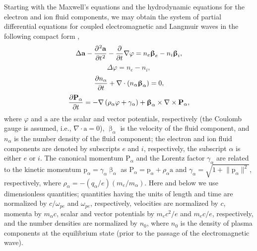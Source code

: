 \documentclass[10pt, a4paper, twoside, openright]{report}
\newcommand{\norm}[1]{\lVert#1\rVert}
\renewcommand{\vec}[1]{\boldsymbol{\mathrm{#1}}}
\newcommand{\rot}[1]{\nabla \times #1}
\newcommand{\grad}[1]{\nabla #1}
\renewcommand{\div}[1]{\nabla \cdot #1}
\newcommand{\laplace}[1]{\Delta #1}
\begin{document}
Starting with the Maxwell's equations and the hydrodynamic equations for the electron and ion fluid components, we may obtain the system of partial differential equations for coupled electromagnetic and Langmuir waves in the following compact form \cite{Farina2001, Bulanov2013, Bulanov2021},
\begin{equation}\label{eq:eq_for_vector_potential}
\laplace{\vec{a}} - \diffp[2]{\vec{a}}{t} - \diffp{}{t} \grad{\varphi} = n_e \vec{\upbeta}_e - n_i \vec{\upbeta}_i,
\end{equation}
\begin{equation}\label{eq:eq_for_scalar_potential}
\laplace{\varphi} = n_e - n_i,
\end{equation}
\begin{equation}\label{eq:eq_for_density}
\diffp{n_{\alpha}}{t} +  \div{ \left( n_{\alpha} \vec{\upbeta}_{\alpha} \right) } = 0,
\end{equation}
\begin{equation}\label{eq:eq_for_momentum}
\diffp{\vec{P}_{\alpha}}{t} = - \grad{\left( \rho_{\alpha} \varphi + \gamma_{\alpha} \right)} + \vec{\upbeta}_{\alpha} \times \rot{\vec{P}_{\alpha}},
\end{equation}
where $ \varphi $ and $ \vec{a} $ are the scalar and vector potentials, respectively (the Coulomb gauge is assumed, i.e., $ \div{\vec{a}} = 0 $), $ \vec{\upbeta}_{\alpha} $ is the velocity of the fluid component, and $ n_{\alpha} $ is the number density of the fluid component; the electron and ion fluid components are denoted by subscripts $ e $ and $ i $, respectively, the subscript $ \alpha $ is either $ e $ or $ i $. The canonical momentum $ \vec{P}_{\alpha} $ and the Lorentz factor $ \gamma_{\alpha} $ are related to the kinetic momentum $ \vec{p}_{\alpha} = \gamma_{\alpha} \vec{\upbeta}_{\alpha} $ as $ \vec{P}_{\alpha} = \vec{p}_{\alpha} + \rho_{\alpha} \vec{a} $ and $ \gamma_{\alpha} = \sqrt{1 + \norm{\vec{p}_{\alpha}}^2} $, respectively, where $ \rho_{\alpha} = - \left( q_{\alpha} / e \right) \left( m_e / m_{\alpha} \right) $. Here and below we use dimensionless quantities; quantities having the units of length and time are normalized by $ c / \omega_{pe} $ and $ \omega_{pe} $, respectively, velocities are normalized by $ c $, momenta by $ m_{\alpha} c $, scalar and vector potentials by $ m_e c^2 / e $ and $ m_e c / e $, respectively, and the number densities are normalized by $ n_0 $, where $ n_0 $ is the density of plasma components at the equilibrium state (prior to the passage of the electromagnetic wave).
\end{document}
